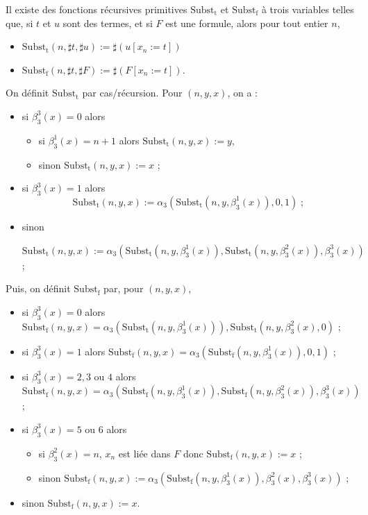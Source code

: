 \documentclass[./main]{subfiles}
\begin{document}
 \begin{lem}[Substitutions]
   Il existe des fonctions récursives primitives $\mathrm{Subst_t}$ et $\mathrm{Subst_f}$ à trois variables telles que, si $t$ et $u$ sont des termes, et si $F$ est une formule, alors pour tout entier $n$, 
   \begin{itemize}
     \item $\mathrm{Subst_t}(n, \sharp t, \sharp u) := \sharp (u[x_n := t])$
     \item $\mathrm{Subst_f}(n, \sharp t, \sharp F) := \sharp (F[x_n := t])$.
   \end{itemize}
 \end{lem}
 \begin{prv}
   On définit $\mathrm{Subst_t}$ par cas/récursion. Pour $(n, y, x)$, on a  :
   \begin{itemize}
     \item si $\beta_3^3(x) = 0$  alors
       \begin{itemize}
         \item si $\beta_3^1(x) = n+1$ alors  $\mathrm{Subst_t}(n, y, x) := y$,
         \item sinon $\mathrm{Subst_t}(n, y, x) := x$ ;
       \end{itemize}
     \item si $\beta_3^3(x) = 1$ alors \[
     \mathrm{Subst_t}(n, y, x) := \alpha_3(\mathrm{Subst_t}(n, y, \beta_3^1(x)), 0, 1) \;;
     \] 
     \item sinon 
       \begin{center}
         \footnotesize
         $\mathrm{Subst_t}(n, y, x) := \alpha_3(\mathrm{Subst_t}(n, y, \beta_3^1(x)), \mathrm{Subst_t}(n, y, \beta_3^2(x)), \beta_3^3(x))$ ;
       \end{center}
   \end{itemize}

   Puis, on définit $\mathrm{Subst_f}$ par, pour $(n, y, x)$,
   \tiny
   \begin{itemize}
     \item si $\beta_3^3(x) = 0$ alors $\mathrm{Subst_f}(n, y, x) = \alpha_3(\mathrm{Subst_t}(n, y, \beta_3^1(x))), \mathrm{Subst_t}(n, y, \beta_3^2(x), 0)$ ;
     \item si $\beta_3^3(x) = 1$ alors $\mathrm{Subst_f}(n, y, x) = \alpha_3(\mathrm{Subst_f}(n, y, \beta_3^1(x)), 0, 1)$ ;
     \item si $\beta_3^3(x) = 2, 3 \text{ ou } 4$ alors $\mathrm{Subst_f}(n, y, x) = \alpha_3(\mathrm{Subst_f}(n, y, \beta_3^1(x)), \mathrm{Subst_f}(n, y, \beta_3^2(x)), \beta_3^3(x))$ ;
     \item si $\beta_3^3(x) = 5 \text{ ou } 6$ alors
       \begin{itemize}
         \item si $\beta_3^2(x) = n$, $x_n$ est liée dans $F$ donc $\mathrm{Subst_f}(n, y, x) := x$ ;
         \item sinon $\mathrm{Subst_f}(n, y, x) := \alpha_3(\mathrm{Subst_f}(n, y, \beta_3^1(x)), \beta_3^2(x), \beta_3^3(x))$ ;
       \end{itemize}
     \item sinon $\mathrm{Subst_f}(n, y, x) := x$.
   \end{itemize}
 \end{prv}
\end{document}
